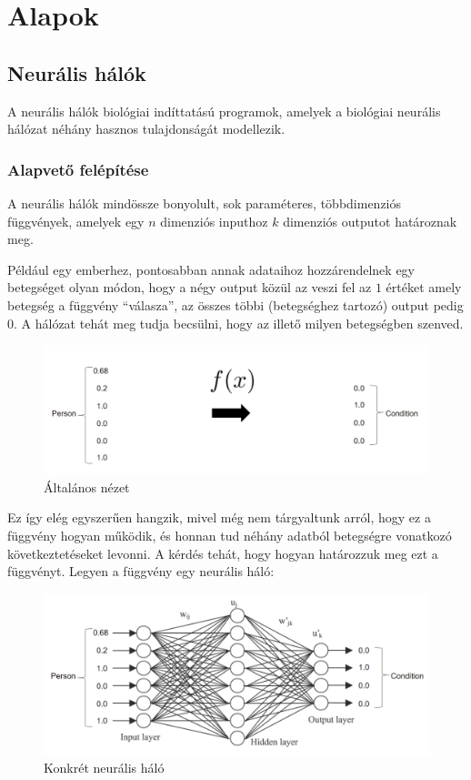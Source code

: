 \documentclass[12pt]{article}
\begin{document}
\section{Alapok}

\subsection{Neurális hálók}

A neurális hálók biológiai indíttatású programok, amelyek a biológiai neurális hálózat néhány hasznos tulajdonságát modellezik.

\subsubsection{Alapvető felépítése}

A neurális hálók mindössze bonyolult, sok paraméteres, többdimenziós függvények, amelyek egy $n$ dimenziós inputhoz $k$ dimenziós outputot határoznak meg.

Például egy emberhez, pontosabban annak adataihoz hozzárendelnek egy betegséget olyan módon, hogy a négy output közül az veszi fel az $1$ értéket amely betegség a függvény “válasza”, az összes többi (betegséghez tartozó) output pedig $0$. A hálózat tehát meg tudja becsülni, hogy az illető milyen betegségben szenved.

\begin{figure}[h!]
  \includegraphics[width=\linewidth]{fgv.png}
  \caption{Általános nézet}
\end{figure}

Ez így elég egyszerűen hangzik, mivel még nem tárgyaltunk arról, hogy ez a függvény hogyan működik, és honnan tud néhány adatból betegségre vonatkozó következtetéseket levonni. A kérdés tehát, hogy hogyan határozzuk meg ezt a függvényt. Legyen a függvény egy neurális háló:

\begin{figure}[h!]
  \includegraphics[width=\linewidth]{fgv_network.png}
  \caption{Konkrét neurális háló}
\end{figure}
\end{document}
